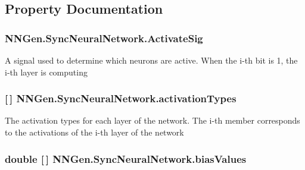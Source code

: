 \subsection{Property Documentation}
\hypertarget{class_n_n_gen_1_1_sync_neural_network_a3d9360657f0a709cc8682eac7465e96f}{}
\subsubsection[{Activate\+Sig}]{ N\+N\+Gen.\+Sync\+Neural\+Network.\+Activate\+Sig\hspace{0.3cm}{\ttfamily [get]}}\label{class_n_n_gen_1_1_sync_neural_network_a3d9360657f0a709cc8682eac7465e96f}


A signal used to determine which neurons are active. When the i-\/th bit is \textquotesingle{}1\textquotesingle{}, the i-\/th layer is computing 

\hypertarget{class_n_n_gen_1_1_sync_neural_network_ab9c0e21b58643ab79c5a540181f91a09}{}
\subsubsection[{activation\+Types}]{ \mbox{[}$\,$\mbox{]} N\+N\+Gen.\+Sync\+Neural\+Network.\+activation\+Types\hspace{0.3cm}{\ttfamily [get]}}\label{class_n_n_gen_1_1_sync_neural_network_ab9c0e21b58643ab79c5a540181f91a09}


The activation types for each layer of the network. The i-\/th member corresponds to the activations of the i-\/th layer of the network 

\hypertarget{class_n_n_gen_1_1_sync_neural_network_ae766b78572c54e97ec3be60f7d623dc7}{}
\subsubsection[{bias\+Values}]{\setlength{\rightskip}{0pt plus 5cm}double \mbox{[}$\,$\mbox{]} N\+N\+Gen.\+Sync\+Neural\+Network.\+bias\+Values\hspace{0.3cm}{\ttfamily [get]}}\label{class_n_n_gen_1_1_sync_neural_network_ae766b78572c54e97ec3be60f7d623dc7}


